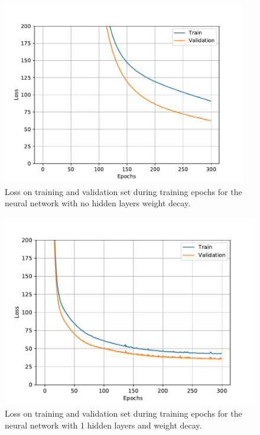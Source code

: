 \begin{figure}[h!]
    \centering
    \includegraphics[width=0.95\textwidth]{pics/figure_Boston_NN_nohidden_wd_loss.pdf}
    \caption{Loss on training and validation set during training epochs for the neural network with no hidden layers weight decay.}
    \label{fig:Boston_NN_nohidden_wd_loss}
\end{figure}

\begin{figure}
    \centering
    \includegraphics[width=\textwidth]{pics/figure_Boston_NN_1hidden_wd_loss.pdf}
    \caption{Loss on training and validation set during training epochs for the neural network with 1 hidden layers and weight decay. }
    \label{fig:Boston_NN_1hidden_wd_loss}
\end{figure}


